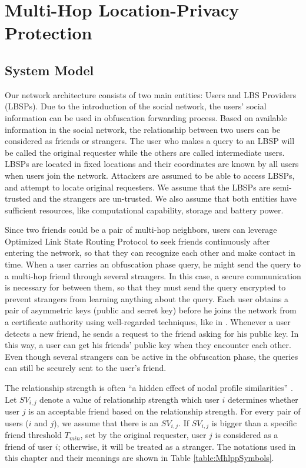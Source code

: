 \chapter {Multi-Hop Location-Privacy Protection}
\label{C_MHLPP}

\section{ System Model}

\noindent Our network architecture consists of two main entities: Users and LBS Providers (LBSPs). Due to the introduction of the social network, the users' social information can be used in obfuscation forwarding process. Based on available information in the social network, the relationship between two users can be considered as friends or strangers. The user who makes a query to an LBSP will be called the original requester while the others are called intermediate users. LBSPs are located in fixed locations and their coordinates are known by all users when users join the network. Attackers are assumed to be able to access LBSPs, and attempt to locate original requesters. We assume that the LBSPs are semi-trusted and the strangers are un-trusted. We also assume that both entities have sufficient resources, like computational capability, storage and battery power.

Since two friends could be a pair of multi-hop neighbors, users can leverage Optimized Link State Routing Protocol \cite{C29} to seek friends continuously after entering the network, so that they can recognize each other and make contact in time. When a user carries an obfuscation phase query, he might send the query to a multi-hop friend through several strangers. In this case, a secure communication is necessary for between them, so that they must send the query encrypted to prevent strangers from learning anything about the query. Each user obtains a pair of asymmetric keys (public and secret key) before he joins the network from a certificate authority using well-regarded techniques, like in \cite{C28}. Whenever a user detects a new friend, he sends a request to the friend asking for his public key. In this way, a user can get his friends' public key when they encounter each other. Even though several strangers can be active in the obfuscation phase, the queries can still be securely sent to the user's friend.

The relationship strength is often ``a hidden effect of nodal profile similarities'' \cite{C30}. Let ${SV}_{i,j}$ denote a value of relationship strength which user $i$ determines whether user $j$ is an acceptable friend based on the relationship strength. For every pair of users ($i$ and $j$), we assume that there is an ${SV}_{i,j}$. If ${SV}_{i,j}$ is bigger than a specific friend threshold $T_{min}$, set by the original requester, user $j$ is considered as a friend of user $i$; otherwise, it will be treated as a stranger. The notations used in this chapter and their meanings are shown in Table \ref{table:MhlppSymbols}. 


